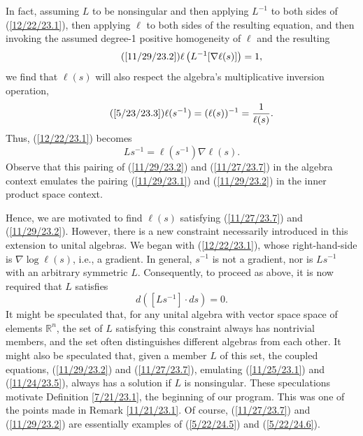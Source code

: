 \documentclass{amsart}
\numberwithin{equation}{section}
\theoremstyle{definition}
\numberwithin{theorem}{section}
\begin{document}
In fact, assuming $L$ to be nonsingular and then applying $L^{-1}$ to both sides of (\ref{12/22/23.1}), then applying $\ell$ to both sides of the resulting equation, and then invoking the assumed degree-1 positive homogeneity of $\ell$ and the resulting \begin{equation}\tag{\ref{11/29/23.2}}\ell\left(L^{-1}[\nabla\ell(s)]\right) = 1,\end{equation} we find that $\ell(s)$ will also respect the algebra's multiplicative inversion operation, \begin{equation}\tag{\ref{5/23/23.3}} \ell(s^{-1}) = (\ell(s))^{-1} = \frac{1}{\ell(s)}.\end{equation}    Thus, (\ref{12/22/23.1}) becomes \begin{equation}\label{11/27/23.7} Ls^{-1} = \ell(s^{-1})\nabla\ell(s).\end{equation}    Observe that this pairing of (\ref{11/29/23.2}) and (\ref{11/27/23.7}) in the algebra context emulates the pairing (\ref{11/29/23.1}) and (\ref{11/29/23.2}) in the inner product space context.
  
  Hence, we are motivated to find $\ell(s)$ satisfying (\ref{11/27/23.7}) and (\ref{11/29/23.2}). 
  However, there is a new constraint necessarily introduced in this extension to unital algebras.  We began with (\ref{12/22/23.1}), whose right-hand-side is $\nabla\log\ell(s)$, i.e., a gradient.  In general, $s^{-1}$ is not a gradient, nor is $Ls^{-1}$ with an arbitrary symmetric $L$. Consequently, to proceed as above, it is now required that $L$ satisfies \[ d([Ls^{-1}]\cdot ds) = 0.\]  It might be speculated that, for any unital algebra with vector space space of elements $\mathbb{R}^n$, the set of $L$ satisfying this constraint always has nontrivial members, and the set often distinguishes different algebras from each other.  It might also be speculated that, given a member $L$ of this set,  the coupled equations, (\ref{11/29/23.2}) and (\ref{11/27/23.7}), emulating (\ref{11/25/23.1}) and (\ref{11/24/23.5}), always has a solution if $L$ is nonsingular.
  These speculations motivate Definition \ref{7/21/23.1}, the beginning of our program.  This was one of the points made in  Remark \ref{11/21/23.1}.  Of course, (\ref{11/27/23.7}) and (\ref{11/29/23.2}) are essentially examples of (\ref{5/22/24.5}) and (\ref{5/22/24.6}). 
\end{document}
